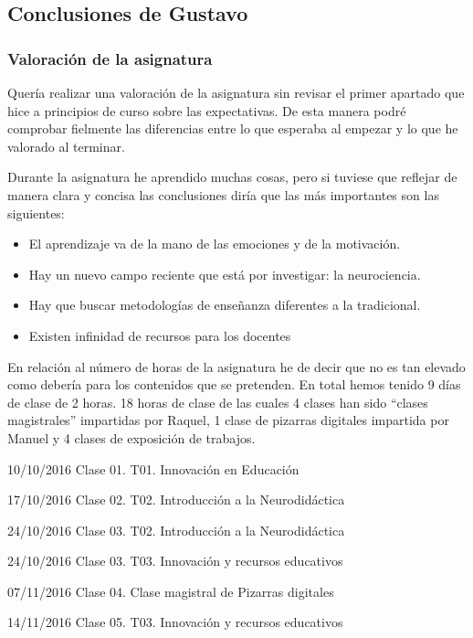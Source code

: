 

\subsection{Conclusiones de Gustavo}
\begin{leftbar}{\guscolor}
\subsubsection{Valoración de la asignatura}

Quería realizar una valoración de la asignatura sin revisar el primer apartado que hice a principios de curso sobre las expectativas. De esta manera podré comprobar fielmente las diferencias entre lo que esperaba al empezar y lo que he valorado al terminar.

Durante la asignatura he aprendido muchas cosas, pero si tuviese que reflejar de manera clara y concisa las conclusiones diría que las más importantes son las siguientes:

\begin{itemize}
\item El aprendizaje va de la mano de las emociones y de la motivación.
\item Hay un nuevo campo reciente que está por investigar: la neurociencia.
\item Hay que buscar metodologías de enseñanza diferentes a la tradicional.
\item Existen infinidad de recursos para los docentes
\end{itemize}

En relación al número de horas de la asignatura he de decir que no es tan elevado como debería para los contenidos que se pretenden. En total hemos tenido 9 días de clase de 2 horas. 18 horas de clase de las cuales 4 clases han sido “clases magistrales” impartidas por Raquel, 1 clase de pizarras digitales impartida por Manuel y 4 clases de exposición de trabajos.

10/10/2016 Clase 01. T01. Innovación en Educación

17/10/2016 Clase 02. T02. Introducción a la Neurodidáctica

24/10/2016 Clase 03. T02. Introducción a la Neurodidáctica

24/10/2016 Clase 03. T03. Innovación y recursos educativos

07/11/2016 Clase 04. Clase magistral de Pizarras digitales

14/11/2016 Clase 05. T03. Innovación y recursos educativos


\end{leftbar}
